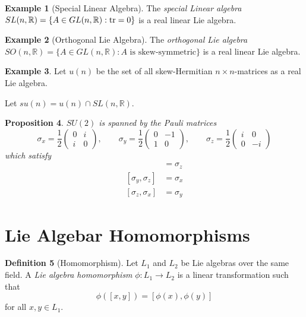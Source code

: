 \documentclass{book}
\newtheorem{prop}{Proposition}[chapter]
\theoremstyle{definition}
\newtheorem{df}[prop]{Definition}
\newtheorem{ex}[prop]{Example}
\begin{document}
\begin{ex}[Special Linear Algebra]
The \emph{special Linear algebra}
$SL(n,\mathbb{R}) = \{ A \in GL(n,\mathbb{R}) : \tr A = 0 \}$ is a real linear Lie algebra.
\end{ex}

\begin{ex}[Orthogonal Lie Algebra]
The \emph{orthogonal Lie algebra}
$SO(n,\mathbb{R}) = \{ A \in GL(n,\mathbb{R}) : A \text{ is skew-symmetric} \}$ is a real linear Lie algebra.
\end{ex}

\begin{ex}
Let $u(n)$ be the set of all skew-Hermitian $n \times n$-matrices as a real Lie algebra.

Let $su(n) = u(n) \cap SL(n, \mathbb{R})$.
\end{ex}

\begin{prop}
$SU(2)$ is spanned by the \emph{Pauli matrices}
\[ \sigma_x = \frac{1}{2} \left( \begin{array}{cc}
0 & i \\
i & 0 \end{array} \right), \qquad
\sigma_y = \frac{1}{2} \left( \begin{array}{cc}
0 & -1 \\
1 & 0 \end{array} \right), \qquad
\sigma_z = \frac{1}{2} \left( \begin{array}{cc}
i & 0 \\
0 & -i
\end{array} \right) \]
which satisfy
\begin{align*}
[\sigma_x, \sigma_y] & = \sigma_z \\
[\sigma_y, \sigma_z] & = \sigma_x \\
[\sigma_z, \sigma_x] & = \sigma_y
\end{align*}
\end{prop}


\section{Lie Algebar Homomorphisms}

\begin{df}[Homomorphism]
Let $L_1$ and $L_2$ be Lie algebras over the same field. A \emph{Lie algebra homomorphism} $\phi : L_1 \rightarrow L_2$ is a linear transformation such that
\[ \phi([x,y]) = [\phi(x), \phi(y)] \]
for all $x,y \in L_1$.
\end{df}
\end{document}
